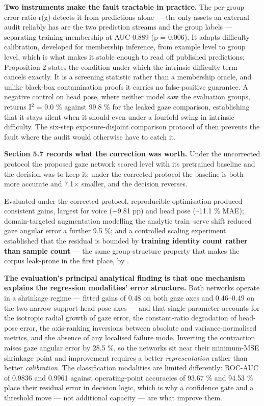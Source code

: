 \textbf{Two instruments make the fault tractable in practice.} The per-group error ratio r(g) detects it from predictions alone --- the only assets an external audit reliably has are the two prediction streams and the group labels --- separating training membership at AUC 0.889 (p = 0.006). It adapts difficulty calibration, developed for membership inference, from example level to group level, which is what makes it stable enough to read off published predictions; Proposition 2 states the condition under which the intrinsic-difficulty term cancels exactly. It is a screening statistic rather than a membership oracle, and unlike black-box contamination proofs it carries no false-positive guarantee. A negative control on head pose, where neither model saw the evaluation groups, returns I$^{2}$ = 0.0 \% against 99.8 \% for the leaked gaze comparison, establishing that it stays silent when it should even under a fourfold swing in intrinsic difficulty. The six-step exposure-disjoint comparison protocol of  then prevents the fault where the audit would otherwise have to catch it.

\textbf{Section 5.7 records what the correction was worth.} Under the uncorrected protocol the proposed gaze network scored level with its pretrained baseline and the decision was to keep it; under the corrected protocol the baseline is both more accurate and 7.1$\times$ smaller, and the decision reverses.

Evaluated under the corrected protocol, reproducible optimisation produced consistent gains, largest for voice (+9.81 pp) and head pose (--11.1 \% MAE); domain-targeted augmentation modelling the analytic train--serve shift  reduced gaze angular error a further 9.5 \%; and a controlled scaling experiment established that the residual is bounded by \textbf{training identity count rather than sample count} --- the same group-structure property that makes the corpus leak-prone in the first place, by .

\textbf{The evaluation's principal analytical finding is that one mechanism explains the regression modalities' error structure.} Both networks operate in a shrinkage regime --- fitted gains of 0.48 on both gaze axes and 0.46--0.49 on the two narrow-support head-pose axes --- and that single parameter accounts for the isotropic radial growth of gaze error, the constant-ratio degradation of head-pose error, the axis-ranking inversions between absolute and variance-normalised metrics, and the absence of any localised failure mode. Inverting the contraction raises gaze angular error by 28.5 \%, so the networks sit near their minimum-MSE shrinkage point and improvement requires a better \emph{representation} rather than better \emph{calibration}. The classification modalities are limited differently: ROC-AUC of 0.9836 and 0.9961 against operating-point accuracies of 93.67 \% and 94.53 \% place their residual error in decision logic, which is why a confidence gate and a threshold move --- not additional capacity --- are what improve them.

